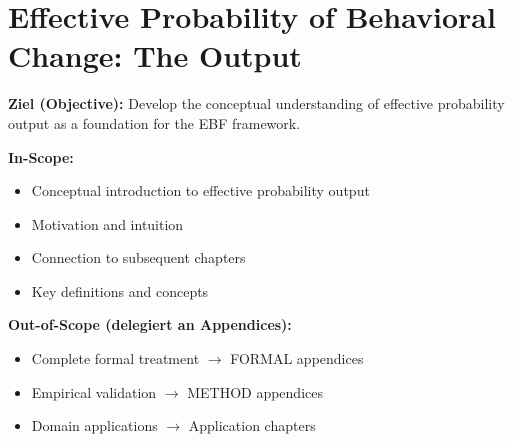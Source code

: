 
%
%
%
%
%


\chapter{Effective Probability of Behavioral Change: The Output}
\label{ch:peff}

\begin{tcolorbox}[
    colback=purple!5!white,
    colframe=purple!75!black,
    title={\textbf{Chapter Scope: Ziel / In-Scope / Out-of-Scope}},
    fonttitle=\bfseries
]

\textbf{Ziel (Objective):}
Develop the conceptual understanding of effective probability output as a foundation for the EBF framework.

\vspace{0.3cm}
\textbf{In-Scope:}
\begin{itemize}[nosep]
    \item Conceptual introduction to effective probability output
    \item Motivation and intuition
    \item Connection to subsequent chapters
    \item Key definitions and concepts
\end{itemize}

\vspace{0.3cm}
\textbf{Out-of-Scope (delegiert an Appendices):}
\begin{itemize}[nosep]
    \item Complete formal treatment $\rightarrow$ FORMAL appendices
    \item Empirical validation $\rightarrow$ METHOD appendices
    \item Domain applications $\rightarrow$ Application chapters
\end{itemize}

\end{tcolorbox}



